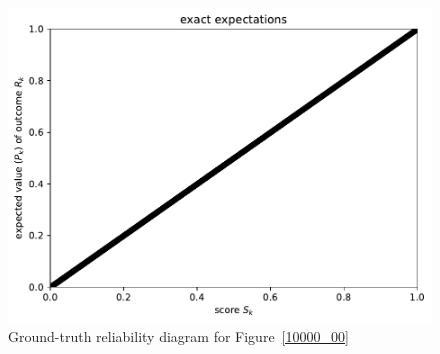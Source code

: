 \documentclass{article}
\begin{document}
\begin{figure}
\begin{centering}

\parbox{\imsize}{\includegraphics[width=\imsize]
                {./codes/unweighted/10000_10_1_3/exact.pdf}}

\end{centering}
\caption{Ground-truth reliability diagram for Figure~\ref{10000_00}}
\label{10000_00e}
\end{figure}
\end{document}
